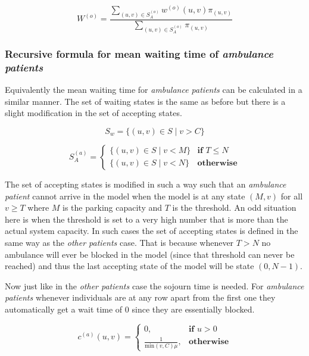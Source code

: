 \begin{equation}
    W^{(o)} = \frac{\sum_{(u,v) \in S_A^{(o)}} w^{(o)}(u,v) \pi_{(u,v)}}{\sum_{(u,v) \in S_A^{(o)}} \pi_{(u,v)}}
\end{equation}



\subsubsection{Recursive formula for mean waiting time of 
\textit{ambulance patients}}

Equivalently the mean waiting time for \textit{ambulance patients} can be calculated 
in a similar manner. 
The set of waiting states is the same as before but there is a slight modification 
in the set of accepting states.

\[
    S_w = \{(u, v) \in S \; | \; v > C \}    
\]

\begin{equation}\label{accepting_states_ambulance}
    S_A^{(a)}=
    \begin{cases}
        \{(u, v) \in S \; | \; v < M \} & \textbf{if } T \leq N\\
        \{(u, v) \in S \; | \; v < N \} & \textbf{otherwise}
    \end{cases}
\end{equation}

The set of accepting states is modified in such a way such that an \textit{ambulance 
patient} cannot arrive in the model when the model is at any state \((M, v)\) for 
all \(v \geq T\) where \(M\) is the parking capacity and \(T\) is the threshold. 
An odd situation here is when the threshold is set to a very high number that is 
more than the actual system capacity. 
In such cases the set of accepting states is defined in the same way as the 
\textit{other patients} case. 
That is because whenever \(T > N\) no ambulance will ever be blocked in the model 
(since that threshold can never be reached) and thus the last accepting state of 
the model will be state \( (0,N-1)\). 

Now just like in the \textit{other patients} case the sojourn time is needed. 
For \textit{ambulance patients} whenever individuals are at any row apart from the 
first one they automatically get a wait time of \(0\) since they are essentially 
blocked.

\begin{equation} \label{eq:sojourn_ambulance}
    c^{(a)}(u,v) = 
    \begin{cases}
        0, & \textbf{if } u > 0 \\
        \frac{1}{\text{min}(v,C)\mu}, & \textbf{otherwise}
    \end{cases}
\end{equation}

